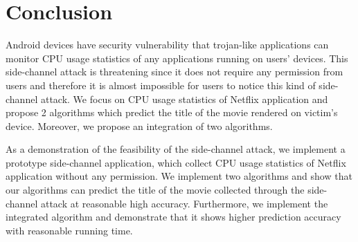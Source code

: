 \section{Conclusion}

Android devices have security vulnerability that trojan-like applications can monitor CPU usage statistics of any applications running on users' devices. 
This side-channel attack is threatening since it does not require any permission from users and therefore it is almost impossible for users to notice this kind of side-channel attack. 
We focus on CPU usage statistics of Netflix application and propose 2 algorithms which predict the title of the movie rendered on victim's device. 
Moreover, we propose an integration of two algorithms.

As a demonstration of the feasibility of the side-channel attack, we implement a prototype side-channel application, which collect CPU usage statistics of Netflix application without any permission.
We implement two algorithms and show that our algorithms can predict the title of the movie collected through the side-channel attack at reasonable high accuracy.
Furthermore, we implement the integrated algorithm and demonstrate that it shows higher prediction accuracy with reasonable running time.
